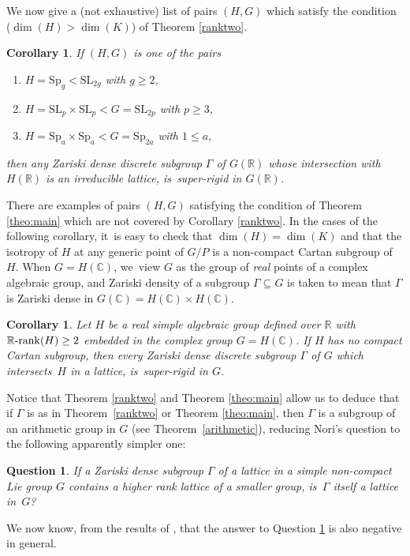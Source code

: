 \documentclass[JEP,XML,SOM,Unicode,published]{cedram}
\newcommand{\Rrank}{\R\textup{-}\rank}
\newtheorem{corollary}[theorem]{Corollary}
\newtheorem{question}[problem]{Question}
\theoremstyle{definition}
\newcommand{\field}[1]{\mathbb{#1}}
\newcommand{\R}{\field{R}}
\newcommand{\C}{\field{C}}
\newcommand{\SL}{\mathrm{SL}}
\newcommand{\Sp}{\mathrm{Sp}}
\newcommand{\rank}{{\operatorname{rank}}}
\begin{document}
We now give a (not exhaustive) list of pairs $(H,G)$ which
satisfy the condition ($\dim (H)>\dim(K)$) of Theorem \ref{ranktwo}.
\begin{corollary} If $(H,G)$ is one of the pairs
\begin{enumerate}
\item $H=\Sp_g< \SL_{2g}$ with $g\geq 2$,
\item $H=\SL_p\times \SL_p< G=\SL_{2p}$ with $p\geq 3$,
\item $H=\Sp_a\times \Sp_a< G=\Sp_{2a}$ with $1\leq a$,
\end{enumerate}
then any Zariski dense discrete subgroup $\Gamma $ of $G(\R)$ whose
intersection with $H(\R)$ is an irreducible lattice, is~super-rigid in
$G(\R)$.
\end{corollary}

There are examples of pairs $(H,G)$ satisfying the condition of
Theorem \ref{theo:main} which are not covered by Corollary
\ref{ranktwo}. In the cases of the following corollary, it~is easy to
check that $\dim (H)=\dim(K)$ and that the isotropy of $H$ at any
generic point of $G/P$ is a non-compact Cartan subgroup of $H$. When
$G=H(\C)$, we~view $G$ as the group of \emph{real} points of a complex
algebraic group, and Zariski density of a subgroup $\Gamma \subseteq G$
is taken to mean that $\Gamma $ is Zariski dense in $G(\C)=H(\C)\times
H(\C)$.

\begin{corollary} Let $H$ be a real simple algebraic group defined over $\R$ with
$\Rrank(H)\geq 2$ embedded in the complex group $G=H(\C)$. If $H$ has no
compact Cartan subgroup, then every Zariski dense discrete subgroup
$\Gamma $ of $G$ which intersects~$H$ in a lattice, is~super-rigid in
$G$.
\end{corollary}

Notice that Theorem \ref{ranktwo} and Theorem \ref{theo:main} allow
us to deduce that if $\Gamma $ is as in Theorem~\ref{ranktwo} or
Theorem \ref{theo:main}, then $\Gamma$ is a subgroup of an
arithmetic group in $G$ (see Theorem~\ref{arithmetic}), reducing
Nori's question to the following apparently simpler one:

\begin{question} \label{nori'} If a Zariski dense subgroup $\Gamma $
of a lattice in a simple non-compact Lie group $G$ contains a higher
rank lattice of a smaller group, is~$\Gamma $ itself a lattice in~$G$?
\end{question}

We now know, from the results of \cite{DGK}, that the answer to Question \ref{nori'} is also negative in general.
\end{document}
